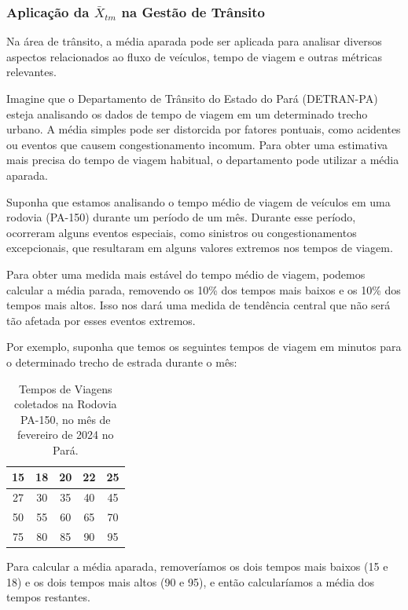 \newpage
\subsubsection{Aplicação da $\bar{X}_{tm}$ na Gestão de Trânsito}

Na área de trânsito, a média aparada pode ser aplicada para analisar diversos aspectos relacionados ao fluxo de veículos, tempo de viagem e outras métricas relevantes. \vskip0.3cm


Imagine que o Departamento de Trânsito do Estado do Pará (DETRAN-PA) esteja analisando os dados de tempo de viagem em um determinado trecho urbano. A média simples pode ser distorcida por fatores pontuais, como acidentes ou eventos que causem congestionamento incomum. Para obter uma estimativa mais precisa do tempo de viagem habitual, o departamento pode utilizar a média aparada.\vskip0.3cm

Suponha que estamos analisando o tempo médio de viagem de veículos em uma rodovia (PA-150) durante um período de um mês. Durante esse período, ocorreram alguns eventos especiais, como sinistros ou congestionamentos excepcionais, que resultaram em alguns valores extremos nos tempos de viagem.\vskip0.3cm

Para obter uma medida mais estável do tempo médio de viagem, podemos calcular a média parada, removendo os 10\% dos tempos mais baixos e os 10\% dos tempos mais altos. Isso nos dará uma medida de tendência central que não será tão afetada por esses eventos extremos.\vskip0.3cm


Por exemplo, suponha que temos os seguintes tempos de viagem em minutos para o determinado trecho de estrada durante o mês:\vskip0.3cm

\begin{table}
    \centering
    \begin{tabular}{c|c|c|c|c}
    \hline \hline
        15 & 18 & 20 & 22 & 25 \\
        \hline
        27 & 30 & 35 & 40 & 45 \\
        \hline
        50 & 55 & 60 & 65 & 70 \\
        \hline
        75 & 80 & 85 & 90 & 95 \\
    \hline \hline
    \end{tabular}
    \caption{Tempos de Viagens coletados na Rodovia PA-150, no mês de fevereiro de 2024 no Pará.}
    \label{tab:my_label}
\end{table}

Para calcular a média aparada, removeríamos os dois tempos mais baixos (15 e 18) e os dois tempos mais altos (90 e 95), e então calcularíamos a média dos tempos restantes.\vskip0.3cm

